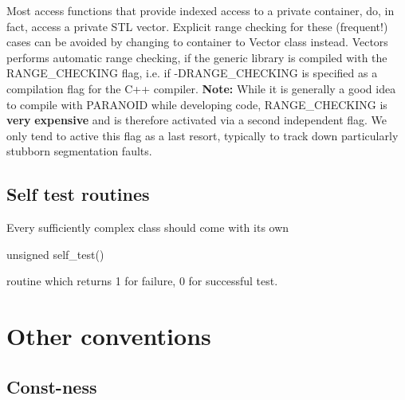 \begin{DoxyItemize}
\item Most access functions that provide indexed access to a private container, do, in fact, access a private S\+TL vector. Explicit range checking for these (frequent!) cases can be avoided by changing to container to Vector class instead. Vectors performs automatic range checking, if the {\ttfamily generic} library is compiled with the {\ttfamily R\+A\+N\+G\+E\+\_\+\+C\+H\+E\+C\+K\+I\+NG} flag, i.\+e. if {\ttfamily -\/\+D\+R\+A\+N\+G\+E\+\_\+\+C\+H\+E\+C\+K\+I\+NG} is specified as a compilation flag for the C++ compiler. {\bfseries Note\+:} While it is generally a good idea to compile with {\ttfamily P\+A\+R\+A\+N\+O\+ID} while developing code, {\ttfamily R\+A\+N\+G\+E\+\_\+\+C\+H\+E\+C\+K\+I\+NG} is {\bfseries very} {\bfseries expensive} and is therefore activated via a second independent flag. We only tend to active this flag as a last resort, typically to track down particularly stubborn segmentation faults.
\end{DoxyItemize}\hypertarget{index_self_test}{}\subsection{Self test routines}\label{index_self_test}

\begin{DoxyItemize}
\item Every sufficiently complex class should come with its own 
\begin{DoxyCode}
\textcolor{keywordtype}{unsigned} self\_test() 
\end{DoxyCode}
 routine which returns 1 for failure, 0 for successful test.
\end{DoxyItemize}



 

\hypertarget{index_other}{}\section{Other conventions}\label{index_other}
\hypertarget{index_constness}{}\subsection{Const-\/ness}\label{index_constness}

